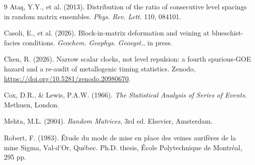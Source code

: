 \documentclass[11pt]{article}
\begin{document}
\begin{thebibliography}{9}
Ata\c{s}, Y.Y., et al. (2013).
Distribution of the ratio of consecutive level spacings in random matrix
ensembles. \emph{Phys. Rev. Lett.} 110, 084101.

Casoli, E., et al. (2026).
Block-in-matrix deformation and veining at blueschist-facies conditions.
\emph{Geochem. Geophys. Geosyst.}, in press.

Chen, R. (2026).
Narrow scalar clocks, not level repulsion: a fourth spurious-GOE hazard and a
re-audit of metallogenic timing statistics. Zenodo,
\url{https://doi.org/10.5281/zenodo.20980670}.

Cox, D.R., \& Lewis, P.A.W. (1966).
\emph{The Statistical Analysis of Series of Events.} Methuen, London.

Mehta, M.L. (2004). \emph{Random Matrices}, 3rd ed. Elsevier, Amsterdam.

Robert, F. (1983).
\'Etude du mode de mise en place des veines aurif\`eres de la mine Sigma,
Val-d'Or, Qu\'ebec. Ph.D. thesis, \'Ecole Polytechnique de Montr\'eal, 295 pp.
\end{thebibliography}
\end{document}
